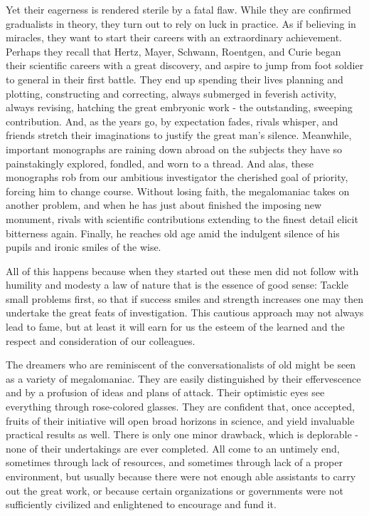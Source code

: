\documentclass{article}
\begin{document}
Yet their eagerness is rendered sterile by a fatal flaw. While they are confirmed gradualists in theory, they turn out to rely on luck in practice. As if believing in miracles, they want to start their careers with an extraordinary achievement. Perhaps they recall that Hertz, Mayer, Schwann, Roentgen, and Curie began their scientific careers with a great discovery, and aspire to jump from foot soldier to general in their first battle. They end up spending their lives planning and plotting, constructing and correcting, always submerged in feverish activity, always revising, hatching the great embryonic work - the outstanding, sweeping contribution. And, as the years go, by expectation fades, rivals whisper, and friends stretch their imaginations to justify the great man’s silence. Meanwhile, important monographs are raining down abroad on the subjects they have so painstakingly explored, fondled, and worn to a thread. And alas, these monographs rob from our ambitious investigator the cherished goal of priority, forcing him to change course. Without losing faith, the megalomaniac takes on another problem, and when he has just about finished the imposing new monument, rivals with scientific contributions extending to the finest detail elicit bitterness again. Finally, he reaches old age amid the indulgent silence of his pupils and ironic smiles of the wise.

All of this happens because when they started out these men did not follow with humility and modesty a law of nature that is the essence of good sense: Tackle small problems first, so that if success smiles and strength increases one may then undertake the great feats of investigation. This cautious approach may not always lead to fame, but at least it will earn for us the esteem of the learned and the respect and consideration of our colleagues.

The dreamers who are reminiscent of the conversationalists of old might be seen as a variety of megalomaniac. They are easily distinguished by their effervescence and by a profusion of ideas and plans of attack. Their optimistic eyes see everything through rose-colored glasses. They are confident that, once accepted, fruits of their initiative will open broad horizons in science, and yield invaluable practical results as well. There is only one minor drawback, which is deplorable - none of their undertakings are ever completed. All come to an untimely end, sometimes through lack of resources, and sometimes through lack of a proper environment, but usually because there were not enough able assistants to carry out the great work, or because certain organizations or governments were not sufficiently civilized and enlightened to encourage and fund it.
\end{document}
